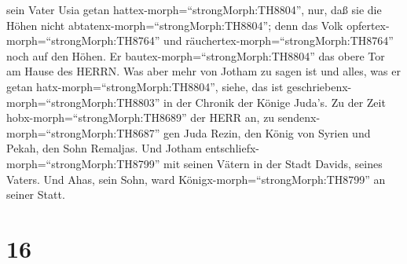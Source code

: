 sein Vater Usia getan hattex-morph=``strongMorph:TH8804'', 
nur, daß sie die Höhen nicht abtatenx-morph=``strongMorph:TH8804''; denn
das Volk opfertex-morph=``strongMorph:TH8764'' und
räuchertex-morph=``strongMorph:TH8764'' noch auf den Höhen. Er
bautex-morph=``strongMorph:TH8804'' das obere Tor am Hause des HERRN.
 Was aber mehr von Jotham zu sagen ist und alles, was er
getan hatx-morph=``strongMorph:TH8804'', siehe, das ist
geschriebenx-morph=``strongMorph:TH8803'' in der Chronik der Könige
Juda's.  Zu der Zeit hobx-morph=``strongMorph:TH8689'' der
HERR an, zu sendenx-morph=``strongMorph:TH8687'' gen Juda Rezin, den
König von Syrien und Pekah, den Sohn Remaljas.  Und Jotham
entschliefx-morph=``strongMorph:TH8799'' mit seinen Vätern in der Stadt
Davids, seines Vaters. Und Ahas, sein Sohn, ward
Königx-morph=``strongMorph:TH8799'' an seiner Statt.

\hypertarget{section-15}{%
\section{16}\label{section-15}}

